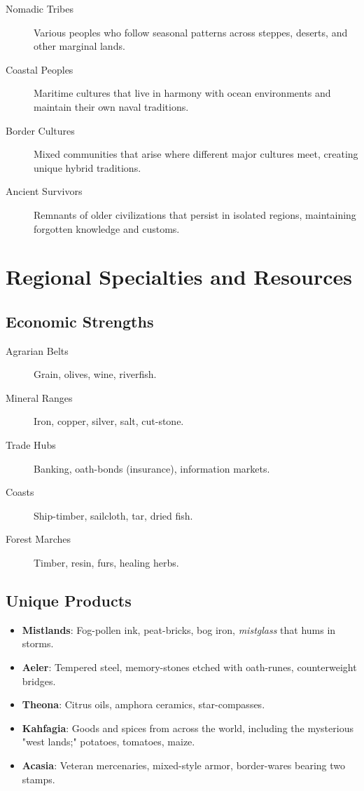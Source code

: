 \begin{description}
\item[Nomadic Tribes] Various peoples who follow seasonal patterns across steppes, deserts, and other marginal lands.
\item[Coastal Peoples] Maritime cultures that live in harmony with ocean environments and maintain their own naval traditions.
\item[Border Cultures] Mixed communities that arise where different major cultures meet, creating unique hybrid traditions.
\item[Ancient Survivors] Remnants of older civilizations that persist in isolated regions, maintaining forgotten knowledge and customs.
\end{description}

\section{Regional Specialties and Resources}

\subsection*{Economic Strengths}
\begin{description}
\item[Agrarian Belts] Grain, olives, wine, riverfish.
\item[Mineral Ranges] Iron, copper, silver, salt, cut-stone.
\item[Trade Hubs] Banking, oath-bonds (insurance), information markets.
\item[Coasts] Ship-timber, sailcloth, tar, dried fish.
\item[Forest Marches] Timber, resin, furs, healing herbs.
\end{description}

\subsection*{Unique Products}
\begin{itemize}
\item \textbf{Mistlands}: Fog-pollen ink, peat-bricks, bog iron, \emph{mistglass} that hums in storms.
\item \textbf{Aeler}: Tempered steel, memory-stones etched with oath-runes, counterweight bridges.
\item \textbf{Theona}: Citrus oils, amphora ceramics, star-compasses.
\item \textbf{Kahfagia}: Goods and spices from across the world, including the mysterious "west lands;" potatoes, tomatoes, maize.
\item \textbf{Acasia}: Veteran mercenaries, mixed-style armor, border-wares bearing two stamps.
\end{itemize}

